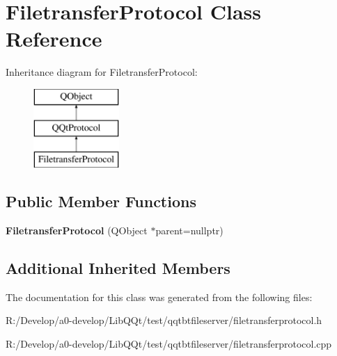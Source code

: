 \hypertarget{class_filetransfer_protocol}{}\section{Filetransfer\+Protocol Class Reference}
\label{class_filetransfer_protocol}
Inheritance diagram for Filetransfer\+Protocol\+:\begin{figure}[H]
\begin{center}
\leavevmode
\includegraphics[height=3.000000cm]{class_filetransfer_protocol}
\end{center}
\end{figure}
\subsection*{Public Member Functions}
\begin{DoxyCompactItemize}
\item 
\mbox{\label{class_filetransfer_protocol_a7a27338f26a23faae8029f27c229e1fa}} 
{\bfseries Filetransfer\+Protocol} (Q\+Object $\ast$parent=nullptr)
\end{DoxyCompactItemize}
\subsection*{Additional Inherited Members}


The documentation for this class was generated from the following files\+:\begin{DoxyCompactItemize}
\item 
R\+:/\+Develop/a0-\/develop/\+Lib\+Q\+Qt/test/qqtbtfileserver/filetransferprotocol.\+h\item 
R\+:/\+Develop/a0-\/develop/\+Lib\+Q\+Qt/test/qqtbtfileserver/filetransferprotocol.\+cpp\end{DoxyCompactItemize}
